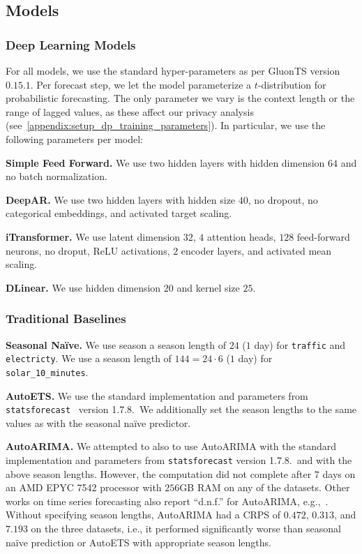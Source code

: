 \subsection{Models}

\subsubsection{Deep Learning Models}

For all models, we use the standard hyper-parameters as per GluonTS version $0.15.1$.
Per forecast step, we let the model parameterize a $t$-distribution for probabilistic forecasting. 
The only parameter we vary is the context length or the range of lagged values, as  these affect our privacy analysis (see~\cref{appendix:setup_dp_training_parameters}).
In particular, we use the following parameters per model:

\textbf{Simple Feed Forward.} We use two hidden layers with hidden dimension $64$ and no batch normalization.

\textbf{DeepAR.} We use two hidden layers with hidden size $40$, no dropout, no categorical embeddings, and activated target scaling.

\textbf{iTransformer.} We use latent dimension $32$, $4$ attention heads, $128$ feed-forward neurons, no droput, ReLU activations, $2$ encoder layers, and activated mean scaling.

\textbf{DLinear.} We use hidden dimension $20$ and kernel size $25$.

\subsubsection{Traditional Baselines}

\textbf{Seasonal Na\"ive.} We use season a season length of $24$ ($1$ day) for \texttt{traffic} and \texttt{electricty}.
We use a season length of $144 = 24 \cdot 6$ ($1$ day) for \texttt{solar\_10\_minutes}.

\textbf{AutoETS.} We use the standard implementation and parameters from \texttt{statsforecast}~\cite{garza2022statsforecast} version 1.7.8.\ We additionally set the season lengths to the same values as with the seasonal na\"ive predictor.

\textbf{AutoARIMA.} We attempted to also to use AutoARIMA with the standard implementation and parameters from \texttt{statsforecast} version 1.7.8.\ and with the above season lengths.
However, the computation did not complete after $7$ days on an AMD EPYC 7542 processor with $256$GB RAM on any of the datasets. 
Other works on time series forecasting also report ``d.n.f.'' for AutoARIMA, e.g.,~\cite{alexandrov2019gluonts,shchur2023autogluon}.
Without specifying season lengths, AutoARIMA had a CRPS of $0.472$, $0.313$, and $7.193$ on the three datasets, i.e., it performed significantly worse than seasonal na\"ive prediction or AutoETS with appropriate season lengths.

